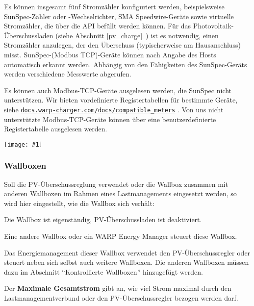 \documentclass[a4paper,10pt]{article}
\newcommand{\gfx}[1]{\texttt{[image: \#1]}}
\newcommand*{\fullref}[1]{Abschnitt \hyperref[{#1}]{\ref*{#1}~\nameref*{#1}}}
\newcommand\rurl[2]{%
  \href{#1}{\nolinkurl{#2}}%
}
\begin{document}
\begin{multicols*}{2}
    \vspace*{-0.1cm}
    Es können insgesamt fünf Stromzähler konfiguriert werden, beispielsweise SunSpec-Zähler oder -Wechselrichter, SMA Speedwire-Geräte
    sowie virtuelle Stromzähler, die über die API befüllt werden können. Für das
	Photovoltaik-Überschussladen (siehe \fullref{pv_charge}) ist es notwendig,
	einen Stromzähler anzulegen, der den Überschuss (typischerweise am Hausanschluss) misst. SunSpec-(Modbus TCP)-Geräte können nach Angabe des Hosts
    automatisch erkannt werden. Abhängig von den Fähigkeiten des SunSpec-Geräts werden verschiedene Messwerte abgerufen.

    \vspace*{-0.1cm}
    Es können auch Modbus-TCP-Geräte ausgelesen werden, die SunSpec nicht unterstützen. Wir bieten vordefinierte Registertabellen für bestimmte Geräte, siehe \rurl{https://docs.warp-charger.com/docs/compatible\_meters}{docs.warp-charger.com/docs/compatible\_meters}. Von uns nicht unterstützte Modbus-TCP-Geräte können über eine benutzerdefinierte Registertabelle ausgelesen werden.

    \gfx{./img_warp3/resized/web_meters}

	\subsubsection{Wallboxen}

    Soll die PV-Überschussreglung verwendet oder
    die Wallbox zusammen mit anderen Wallboxen im Rahmen eines
	Lastmanagements eingesetzt werden, so wird hier
	eingestellt, wie die Wallbox sich verhält:
	\begin{description}[labelindent=0.5cm, leftmargin=0.5cm]
		\item[Deaktiviert] Die Wallbox ist eigenständig, PV-Über\-schussladen ist deaktiviert.
		\item[Fremdgesteuert] Eine andere Wallbox oder ein WARP Energy Manager steuert diese Wallbox.
		\item[Lastmanager / PV-Überschussladen] Das Energiemanagement dieser Wallbox verwendet den PV-Überschussregler oder steuert neben sich selbst auch weitere Wallboxen. Die anderen Wallboxen müssen dazu im
		Abschnitt \enquote{Kontrollierte Wallboxen} hinzugefügt werden.
	\end{description}

	Der \textbf{Maximale Gesamtstrom} gibt an, wie viel Strom maximal durch den Lastmanagementverbund oder den PV-Überschussregler bezogen werden darf.


\end{multicols*}
\end{document}
